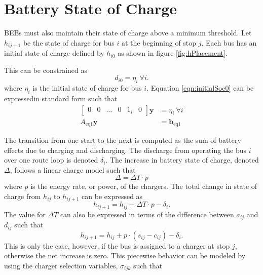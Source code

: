 \section{Battery State of Charge}
BEBs must also maintain their state of charge above a minimum threshold. Let $h_{ij+1}$ be the state of charge for bus $i$ at the beginning of stop $j$. Each bus has an initial state of charge defined by $h_{i0}$ as shown in figure \ref{fig:hPlacement}. 

This can be constrained as
\begin{equation}\label{eqn:initialSoc0}
	d_{i0} = \eta_{i} \ \forall i.
\end{equation}
where $\eta_{i}$ is the initial state of charge for bus $i$.
Equation \ref{eqn:initialSoc0} can be expressedin standard form such that
\begin{equation} \begin{aligned}
	\begin{bmatrix}0 & 0 & \hdots & 0 & 1_i& 0 \end{bmatrix}\mathbf{y} &= \eta_i \ \forall i \\
		A_{\text{eq1}}\mathbf{y} &= \mathbf{b}_{\text{eq1}}
\end{aligned} \end{equation}

\par The transition from one start to the next is computed as the sum of battery effects due to charging and discharging. The discharge from operating the bus $i$ over one route loop is denoted $\delta_i$. The increase in battery state of charge, denoted $\Delta$, follows a linear charge model such that 
\begin{equation}
	\Delta = \Delta T\cdot p
\end{equation}
where $p$ is the energy rate, or power, of the chargers. The total change in state of charge from $h_{ij}$ to $h_{ij+1}$ can be expressed as
\begin{equation}
	h_{ij+1} = h_{ij} + \Delta T\cdot p - \delta_i.
\end{equation}
The value for $\Delta T$ can also be expressed in terms of the difference between $a_{ij}$ and $d_{ij}$ such that
\begin{equation}
	h_{ij+1} = h_{ij} + p\cdot \left ( s_{ij} - c_{ij} \right ) - \delta_i.
\end{equation}
This is only the case, however, if the bus is assigned to a charger at stop $j$, otherwise the net increase is zero. This piecewise behavior can be modeled by using the charger selection variables, $\sigma_{ijk}$ such that
